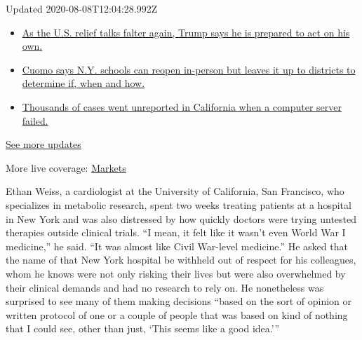 Updated 2020-08-08T12:04:28.992Z

\begin{itemize}
\tightlist
\item
  \href{https://www.nytimes.com/2020/08/07/world/covid-19-news.html?action=click\&pgtype=Article\&state=default\&region=MAIN_CONTENT_1\&context=storylines_live_updates\#link-1f86d03a}{As
  the U.S. relief talks falter again, Trump says he is prepared to act
  on his own.}
\item
  \href{https://www.nytimes.com/2020/08/07/world/covid-19-news.html?action=click\&pgtype=Article\&state=default\&region=MAIN_CONTENT_1\&context=storylines_live_updates\#link-3f64a70a}{Cuomo
  says N.Y. schools can reopen in-person but leaves it up to districts
  to determine if, when and how.}
\item
  \href{https://www.nytimes.com/2020/08/07/world/covid-19-news.html?action=click\&pgtype=Article\&state=default\&region=MAIN_CONTENT_1\&context=storylines_live_updates\#link-14e70066}{Thousands
  of cases went unreported in California when a computer server failed.}
\end{itemize}

\href{https://www.nytimes.com/2020/08/07/world/covid-19-news.html?action=click\&pgtype=Article\&state=default\&region=MAIN_CONTENT_1\&context=storylines_live_updates}{See
more updates}

More live coverage:
\href{https://www.nytimes.com/live/2020/08/07/business/stock-market-today-coronavirus?action=click\&pgtype=Article\&state=default\&region=MAIN_CONTENT_1\&context=storylines_live_updates}{Markets}

Ethan Weiss, a cardiologist at the University of California, San
Francisco, who specializes in metabolic research, spent two weeks
treating patients at a hospital in New York and was also distressed by
how quickly doctors were trying untested therapies outside clinical
trials. ``I mean, it felt like it wasn't even World War I medicine,'' he
said. ``It was almost like Civil War-level medicine.'' He asked that the
name of that New York hospital be withheld out of respect for his
colleagues, whom he knows were not only risking their lives but were
also overwhelmed by their clinical demands and had no research to rely
on. He nonetheless was surprised to see many of them making decisions
``based on the sort of opinion or written protocol of one or a couple of
people that was based on kind of nothing that I could see, other than
just, `This seems like a good idea.'''

